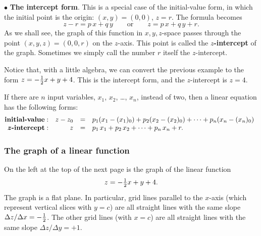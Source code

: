 {{{{\noindent$\bullet$ {\bf The intercept form}.    
This is a special case of the initial-value form, in which the initial point is the origin: $(x, y) = (0, 0)$, $z = r$.  The formula becomes
	\[
z - r = p \, x + q \, y \qquad \mbox{or} \qquad
		z = p \, x + q \, y + r.
\]
As we shall see, the graph of this function in $x, y, z$-space passes through the point $(x, y, z) = (0, 0, r)$ on the $z$-axis.  This point is called the \mbox{\bf{\boldmath $z$}-intercept} of the graph.  Sometimes we simply call the number $r$ itself the $z$-intercept.

	Notice that, with a little algebra, we can convert the previous example to the form $z = -{1 \over 2}x + y + 4$.  This is the intercept form, and the $z$-intercept is $z = 4$.
\smallskip

	If there are $n$ input variables, $x_1$, $x_2$, \ldots , $x_n$, 
instead of two, then a linear equation has the following forms:
	\[
\hspace{-5pt}
	\begin{array}{rrcl}
	\mbox{\bf initial-value}: & z - z_0 &=& p_1 (x_1 - (x_1)_0) + 
		p_2 (x_2 - (x_2)_0) 
		+ \cdots + p_n (x_n - (x_n)_0) \\
	\mbox{\bf {\boldmath $z$}-intercept}: & z &=& p_1 \, x_1 + p_2 \, x_2 
		+ \cdots + p_n \, x_n + r.
	\end{array}
\]

\subsubsection{The graph of a linear function}

	On the left at the top of the next page is the graph of the linear function
	\[
z = -{\textstyle {1 \over 2}} x  + y + 4.
\]
The graph is a flat plane.  In particular, grid lines parallel to the $x$-axis (which represent vertical slices with $y = c$) are all straight lines with the same slope $\Delta z/\Delta x = -{1 \over 2}$.  The other grid lines (with $x = c$) are all straight lines with the same slope $\Delta z/\Delta y = +1$.  



\newpage
\mbox{}
\vspace{144pt}

}}}}
